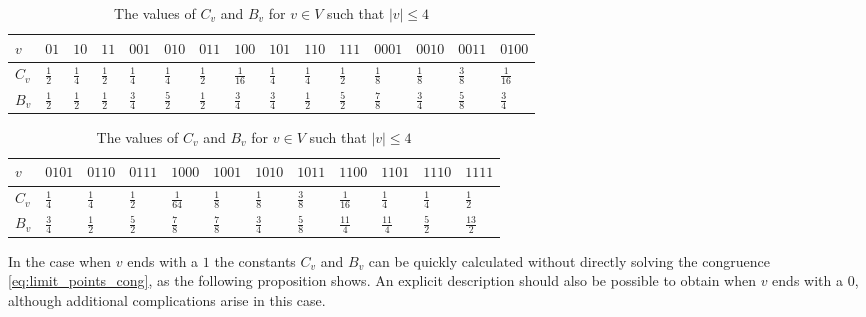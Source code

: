 \documentclass[a4paper,11pt]{amsart}
\theoremstyle{definition}
\begin{document}
\begin{table}[H]  \renewcommand*{\arraystretch}{1.2}
\begin{tabular}{l|llllllllllllll}
$v$&$01$&$10$&$11$&$001$&$010$&$011$&$100$&$101$&$110$&$111$&$0001$&$0010$&$0011$&$0100$\\  \hline 
$C_v$ &$\frac{1}{2}$&$\frac{1}{4}$&$\frac{1}{2}$&$\frac{1}{4}$&$\frac{1}{4}$&$\frac{1}{2}$&$\frac{1}{16}$&$\frac{1}{4}$&$\frac{1}{4}$&$\frac{1}{2}$&$\frac{1}{8}$&$\frac{1}{8}$&$\frac{3}{8}$&$\frac{1}{16}$  \\

$B_v$ &$\frac{1}{2}$&$\frac{1}{2}$&$\frac{1}{2}$&$\frac{3}{4}$&$\frac{5}{2}$&$\frac{1}{2}$&$\frac{3}{4}$&$\frac{3}{4}$&$\frac{1}{2}$&$\frac{5}{2}$&$\frac{7}{8}$&$\frac{3}{4}$&$\frac{5}{8}$&$\frac{3}{4}$  \\

\end{tabular}
\vspace{\baselineskip}

\begin{tabular}{l|lllllllllll}
$v$&$0101$&$0110$&$0111$&$1000$&$1001$&$1010$&$1011$&$1100$&$1101$&$1110$&$1111$  \\ \hline
$C_v$ &$\frac{1}{4}$&$\frac{1}{4}$&$\frac{1}{2}$&$\frac{1}{64}$&$\frac{1}{8}$&$\frac{1}{8}$&$\frac{3}{8}$&$\frac{1}{16}$&$\frac{1}{4}$&$\frac{1}{4}$&$\frac{1}{2}$ \\

$B_v$ &$\frac{3}{4}$&$\frac{1}{2}$&$\frac{5}{2}$&$\frac{7}{8}$&$\frac{7}{8}$&$\frac{3}{4}$&$\frac{5}{8}$&$\frac{11}{4}$&$\frac{11}{4}$&$\frac{5}{2}$&$\frac{13}{2}$ \\
\end{tabular}
\caption{The values of $C_v$ and $B_v$ for $v \in V$ such that $|v| \leq 4$}
\label{tab:C_v}
\end{table}

In the case when $v$ ends with a $1$ the constants $C_v$ and $B_v$ can be quickly calculated without directly solving the congruence \eqref{eq:limit_points_cong}, as the following proposition shows. An explicit description should also be possible to obtain when $v$ ends with a $0$, although additional complications arise in this case.
\end{document}
